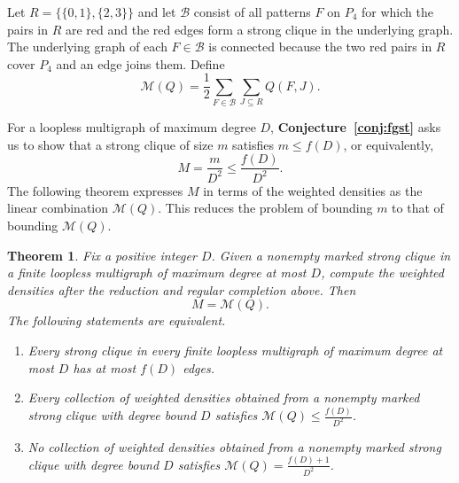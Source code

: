 \documentclass[preprint,11pt,numbers]{elsarticle-arxiv}
\numberwithin{equation}{section}
\newtheorem{theorem}{Theorem}[section]
\theoremstyle{definition}
\begin{document}
Let $R=\{\{0,1\},\{2,3\}\}$ and let $\mathcal B$ consist of all
patterns $F$ on $P_4$ for which the pairs in $R$ are red and the
red edges form a strong clique in the underlying graph. The
underlying graph of each $F\in\mathcal B$ is connected because
the two red pairs in $R$ cover $P_4$ and an edge joins them. Define
\[
 \mathcal M(Q)=\frac{1}{2}\sum_{F\in\mathcal B}
                           \sum_{J\subseteq R} Q(F,J).
\]

For a loopless multigraph of maximum degree $D$,
\textbf{Conjecture~\ref{conj:fgst}} asks us to show that a strong
clique of size $m$ satisfies $m\leq f(D)$, or equivalently,
\[
 M=\frac{m}{D^2}\leq\frac{f(D)}{D^2}.
\]
The following theorem expresses $M$ in terms of the weighted
densities as the linear combination $\mathcal M(Q)$. This reduces
the problem of bounding $m$ to that of bounding $\mathcal M(Q)$.

\begin{theorem}\label{thm:weighted-objective}
Fix a positive integer $D$. Given a nonempty marked strong clique
in a finite loopless multigraph of maximum degree at most $D$,
compute the weighted densities after the reduction and regular
completion above. Then
\begin{equation}\label{eq:weighted-objective}
 M=\mathcal M(Q).
\end{equation}
The following statements are equivalent.
\begin{enumerate}[label=\textup{(\roman*)}]
 \item Every strong clique in every finite loopless multigraph of
       maximum degree at most $D$ has at most $f(D)$ edges.
 \item Every collection of weighted densities obtained from a
       nonempty marked strong clique with degree bound $D$
       satisfies $\mathcal M(Q)\leq\frac{f(D)}{D^2}$.
 \item No collection of weighted densities obtained from a
       nonempty marked strong clique with degree bound $D$
       satisfies $\mathcal M(Q)=\frac{f(D)+1}{D^2}$.
\end{enumerate}
\end{theorem}
\end{document}
